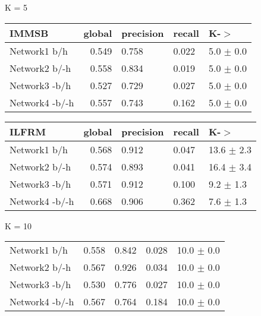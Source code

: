 \begin{table*}[h] \label{table:balanced}
\caption{Predictive Performance on a Balanced Testing set}
	\begin{minipage}[h]{0.45\linewidth} 
K =  5\hspace{5pt}
\begin{tabular}{lrlll}
\hline
 IMMSB   &   global &   precision &   recall &    K-\ensuremath{>} \\
\hline
 Network1 b/h          &    0.549 &       0.758 &    0.022 & 5.0 $\pm$ 0.0 \\
 Network2 b/-h        &    0.558 &       0.834 &    0.019 & 5.0 $\pm$ 0.0 \\
 Network3 -b/h        &    0.527 &       0.729 &    0.027 & 5.0 $\pm$ 0.0 \\
 Network4 -b/-h        &    0.557 &       0.743 &    0.162 & 5.0 $\pm$ 0.0 \\

\hline
\end{tabular}
\end{minipage}
\hspace{0.8cm}
\begin{minipage}[h]{0.45\linewidth}
\begin{tabular}{lrlll}
\hline
 ILFRM   &   global &   precision &   recall &     K-\ensuremath{>} \\
\hline
 Network1 b/h        &    0.568 &       0.912 &    0.047 & 13.6 $\pm$ 2.3 \\
 Network2 b/-h      &    0.574 &       0.893 &    0.041 & 16.4 $\pm$ 3.4 \\
 Network3 -b/h      &    0.571 &       0.912 &    0.100 & 9.2 $\pm$ 1.3 \\
 Network4 -b/-h      &    0.668 &       0.906 &    0.362 & 7.6 $\pm$ 1.3 \\

\hline
\end{tabular}
\end{minipage}


	\begin{minipage}[h]{0.45\linewidth} 
K = 10
\begin{tabular}{lrrrr}
 Network1 b/h          &    0.558 &       0.842 &    0.028 & 10.0 $\pm$ 0.0 \\
 Network2 b/-h        &    0.567 &       0.926 &    0.034 & 10.0 $\pm$ 0.0 \\
 Network3 -b/h        &    0.530 &       0.776 &    0.027 & 10.0 $\pm$ 0.0 \\
 Network4 -b/-h        &    0.567 &       0.764 &    0.184 & 10.0 $\pm$ 0.0 \\


\end{tabular}
\end{minipage}
\end{table*}
